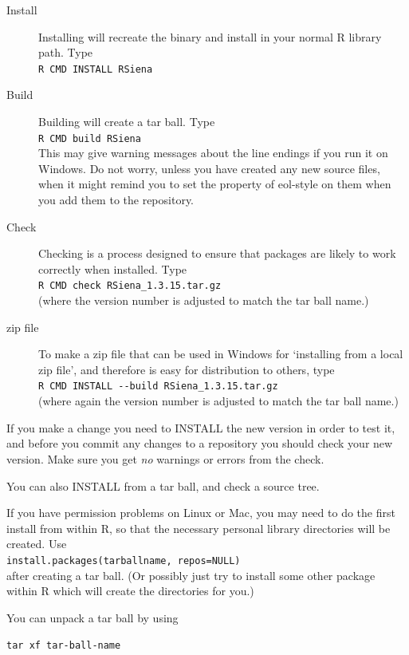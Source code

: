 \documentclass[a4paper,fleqn,11pt]{article}
\newcommand{\+}{\, + \,}
\begin{document}
\begin{description}
\item[Install] Installing will recreate the binary and install in your normal R
  library path. Type\\
\verb|R CMD INSTALL RSiena|
\item[Build] Building will create a tar ball. Type\\
\verb|R CMD build RSiena|\\
This may give warning messages about the line endings if you run it on
Windows. Do not worry, unless you have created any new source files, when it
might remind you to set the property of \textsf{eol-style} on them when you add
them to the repository.
\item [Check] Checking is a process designed to ensure that packages are likely
  to work correctly when installed. Type\\
\verb|R CMD check RSiena_1.3.15.tar.gz|\\
(where the version number is adjusted to match the tar ball name.)
\item[zip file] To make a zip file that can be used in Windows for
`installing from a local zip file', and therefore is easy for distribution
to others, type\\
\verb|R CMD INSTALL --build RSiena_1.3.15.tar.gz| \\
(where again the version number is adjusted to match the tar ball name.)
\end{description}

If you make a change you need to \textsf{INSTALL} the new version in order to
test it, and before you commit any changes to a repository you should
\textsf{check} your new version. Make sure you get \emph{no} warnings or
errors from the check.

You can also \textsf{INSTALL} from a tar ball, and \textsf{check} a source
tree.

If you have permission problems on Linux or Mac, you may need to do the first
install from within \textsf{R}, so that the necessary personal library
directories will be created. Use\\
\verb|install.packages(tarballname, repos=NULL)| \\after creating a tar
ball. (Or possibly just try to install some other package within R which will
create the directories for you.)

You can unpack a tar ball by using

\verb|tar xf tar-ball-name|
\end{document}
